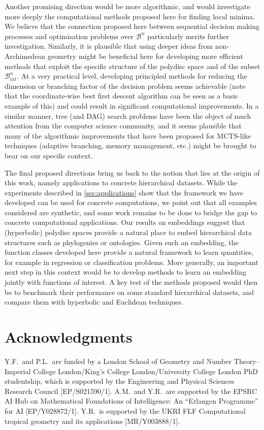 \documentclass[10pt]{article}
\theoremstyle{definition}
\begin{document}
Another promising direction would be more algorithmic, and would investigate more deeply the computational methods proposed here for finding local minima. 
We believe that the connection proposed here between sequential decision making processes and optimisation problems over $\mathcal B ^ n$ particularly merits further investigation. 
Similarly, it is plausible that using deeper ideas from non-Archimedean geometry might be beneficial here for developing more efficient methods that exploit the specific structure of the polydisc space and of the subset $\mathcal B ^ n _ \mathrm{rat}$.
At a very practical level, developing principled methods for reducing the dimension or branching factor of the decision problem seems achievable (note that the coordinate-wise best first descent algorithm can be seen as a basic example of this) and could result in significant computational improvements.
In a similar manner, tree (and DAG) search problems have been the object of much attention from the computer science community, and it seems plausible that many of the algorithmic improvements that have been proposed for MCTS-like techniques (adaptive branching, memory management, etc.) might be brought to bear on our specific context.

The final proposed directions bring us back to the notion that lies at the origin of this work, namely applications to concrete hierarchical datasets.
While the experiments described in \cref{sec:applications} show that the framework we have developed can be used for concrete computations, we point out that all examples considered are synthetic, and some work remains to be done to bridge the gap to concrete computational applications.
Our results on embeddings suggest that (hyperbolic) polydisc spaces provide a natural place to embed hierarchical data structures such as phylogenies or ontologies.
Given such an embedding, the function classes developed here provide a natural framework to learn quantities, for example in regression or classification problems.
More generally, an important next step in this context would be to develop methods to learn an embedding jointly with functions of interest.
A key test of the methods proposed would then be to benchmark their performance on some standard hierarchical datasets, and compare them with hyperbolic and Euclidean techniques.

\section*{Acknowledgments}

Y.F.~and P.L.~are funded by a London School of Geometry and Number Theory--Imperial College London/King's College London/University College London PhD studentship, which is supported by the Engineering and Physical Sciences Research Council [EP/S021590/1].  A.M.~and Y.R.~are supported by the EPSRC AI Hub on Mathematical Foundations of Intelligence: An ``Erlangen Programme'' for AI [EP/Y028872/1]. Y.R.~is supported by the UKRI FLF Computational tropical geometry and its applications [MR/Y003888/1].

\renewcommand{\bibfont}{\small}
\printbibliography
\end{document}
